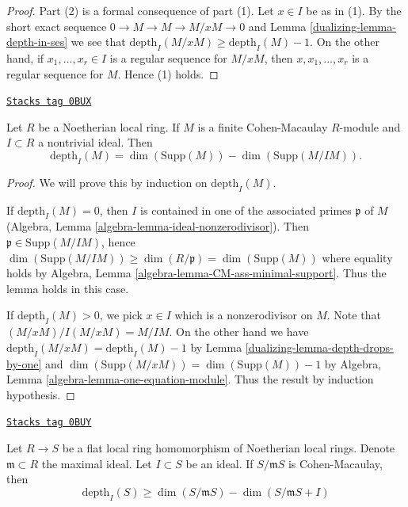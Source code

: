 \begin{proof}

Part (2) is a formal consequence of part (1). Let $x \in I$ be as in (1).
By the short exact sequence $0 \to M \to M \to M/xM \to 0$ and
Lemma \ref{dualizing-lemma-depth-in-ses} we see that
$\text{depth}_I(M/xM) \geq \text{depth}_I(M) - 1$.
On the other hand, if $x_1, \ldots, x_r \in I$
is a regular sequence for $M/xM$, then $x, x_1, \ldots, x_r$
is a regular sequence for $M$. Hence (1) holds.
\end{proof}

\begin{lemma}[Depth CM]
\label{dualizing-lemma-depth-CM}
\href{https://stacks.math.columbia.edu/tag/0BUX}{\texttt{Stacks tag 0BUX}}

Let $R$ be a Noetherian local ring. If $M$ is a finite Cohen-Macaulay
$R$-module and $I \subset R$ a nontrivial ideal. Then
$$
\text{depth}_I(M) = \dim(\text{Supp}(M)) - \dim(\text{Supp}(M/IM)).
$$
\end{lemma}

\begin{proof}

We will prove this by induction on $\text{depth}_I(M)$.

\medskip\noindent
If $\text{depth}_I(M) = 0$, then $I$ is contained in one
of the associated primes $\mathfrak p$ of $M$
(Algebra, Lemma \ref{algebra-lemma-ideal-nonzerodivisor}).
Then $\mathfrak p \in \text{Supp}(M/IM)$, hence
$\dim(\text{Supp}(M/IM)) \geq \dim(R/\mathfrak p) = \dim(\text{Supp}(M))$
where equality holds by
Algebra, Lemma \ref{algebra-lemma-CM-ass-minimal-support}.
Thus the lemma holds in this case.

\medskip\noindent
If $\text{depth}_I(M) > 0$, we pick $x \in I$ which is a
nonzerodivisor on $M$. Note that $(M/xM)/I(M/xM) = M/IM$.
On the other hand we have
$\text{depth}_I(M/xM) = \text{depth}_I(M) - 1$
by Lemma \ref{dualizing-lemma-depth-drops-by-one}
and $\dim(\text{Supp}(M/xM)) = \dim(\text{Supp}(M)) -  1$
by Algebra, Lemma \ref{algebra-lemma-one-equation-module}.
Thus the result by induction hypothesis.
\end{proof}

\begin{lemma}
\label{dualizing-lemma-depth-flat-CM}
\href{https://stacks.math.columbia.edu/tag/0BUY}{\texttt{Stacks tag 0BUY}}

Let $R \to S$ be a flat local ring homomorphism of Noetherian local
rings. Denote $\mathfrak m \subset R$ the maximal ideal.
Let $I \subset S$ be an ideal.
If $S/\mathfrak mS$ is Cohen-Macaulay, then
$$
\text{depth}_I(S) \geq \dim(S/\mathfrak mS) - \dim(S/\mathfrak mS + I)
$$
\end{lemma}

